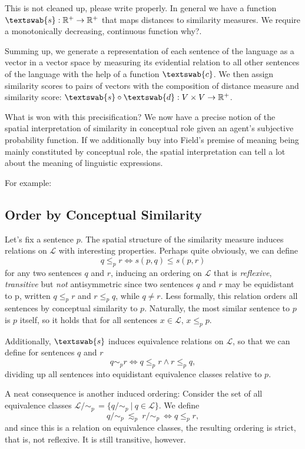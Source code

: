 \documentclass[11pt, a4paper]{scrartcl}
\renewcommand{\i}[1]{\emph{#1}}
\renewcommand{\L}{\mathcal{L}}
\newcommand{\m}[1]{\textswab{#1}}
\newcommand{\given}[1][]{\:#1\vert\:}
\begin{document}
{\color{red}This is not cleaned up, please write properly.}
In general we have a function ${\m{s}: \mathbb{R}^+ \rightarrow \mathbb{R}^+ }$ that maps distances to similarity measures. We require a monotonically decreasing, continuous function {\color{red} why?}. 

Summing up, we generate a representation of each sentence of the language as a vector in a vector space by measuring its evidential relation to all other sentences of the language with the help of a function $\m{c}$. We then assign similarity scores to pairs of vectors with the composition of distance measure and similarity score: ${\m{s}\circ \m{d} : V \times V \rightarrow \mathbb{R}^+}$.

What is won with this precisification? We now have a precise notion of the spatial interpretation of similarity in conceptual role given an agent's subjective probability function. If we additionally buy into Field's premise of meaning being mainly constituted by conceptual role, the spatial interpretation can tell a lot about the meaning of linguistic expressions. 

For example:

\subsection{Order by Conceptual Similarity}

Let's fix a sentence $p$. The spatial structure of the similarity measure induces relations on $\L$ with interesting properties. Perhaps quite obviously, we can define 
\[
    q \leqslant_p r \Leftrightarrow s(p,q) \leqslant s(p,r)
\]
for any two sentences $q$ and $r$, inducing an ordering on $\L$ that is \i{reflexive}, \i{transitive} but \i{not} antisymmetric since two sentences $q$ and $r$ may be equidistant to p, written $q \leqslant_p r$ and $r \leqslant_p q$, while $q \not = r$. Less formally, this relation orders all sentences by conceptual similarity to $p$. Naturally, the most similar sentence to $p$ is $p$ itself, so it holds that for all sentences ${x \in \L}$, ${x\leqslant_p p}$.

Additionally, $\m{s}$ induces equivalence relations on $\L$, so that we can define for sentences $q$ and $r$ 
\[
    q \sim_p r \Leftrightarrow q \leqslant_p r \land r \leqslant_p q,
\]
dividing up all sentences into equidistant equivalence classes relative to $p$.

A neat consequence is another induced ordering: Consider the set of all equivalence classes $\L/\!\sim_p\,=\{ q/\!\sim_p \given q\in \L \}$. We define   
\[
    q/\!\sim_p~\lesssim_p~r/\!\sim_p~\Leftrightarrow q \leqslant_p r, 
\]
and since this is a relation on equivalence classes, the resulting ordering is strict, that is, not reflexive. It is still transitive, however.
\end{document}
